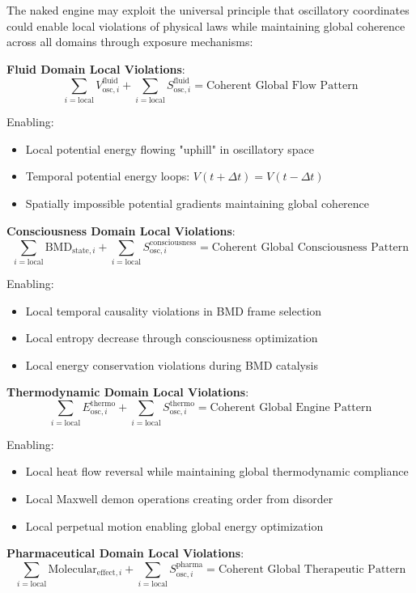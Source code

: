 \documentclass[11pt,a4paper]{article}
\theoremstyle{remark}
\begin{document}
The naked engine may exploit the universal principle that oscillatory coordinates could enable local violations of physical laws while maintaining global coherence across all domains through exposure mechanisms:

\textbf{Fluid Domain Local Violations}:
$$\sum_{i=\text{local}} V_{\text{osc},i}^{\text{fluid}} + \sum_{i=\text{local}} S_{\text{osc},i}^{\text{fluid}} = \text{Coherent Global Flow Pattern}$$

Enabling:
\begin{itemize}
\item Local potential energy flowing "uphill" in oscillatory space
\item Temporal potential energy loops: $V(t+\Delta t) = V(t-\Delta t)$
\item Spatially impossible potential gradients maintaining global coherence
\end{itemize}

\textbf{Consciousness Domain Local Violations}:
$$\sum_{i=\text{local}} \text{BMD}_{\text{state},i} + \sum_{i=\text{local}} S_{\text{osc},i}^{\text{consciousness}} = \text{Coherent Global Consciousness Pattern}$$

Enabling:
\begin{itemize}
\item Local temporal causality violations in BMD frame selection
\item Local entropy decrease through consciousness optimization
\item Local energy conservation violations during BMD catalysis
\end{itemize}

\textbf{Thermodynamic Domain Local Violations}:
$$\sum_{i=\text{local}} E_{\text{osc},i}^{\text{thermo}} + \sum_{i=\text{local}} S_{\text{osc},i}^{\text{thermo}} = \text{Coherent Global Engine Pattern}$$

Enabling:
\begin{itemize}
\item Local heat flow reversal while maintaining global thermodynamic compliance
\item Local Maxwell demon operations creating order from disorder
\item Local perpetual motion enabling global energy optimization
\end{itemize}

\textbf{Pharmaceutical Domain Local Violations}:
$$\sum_{i=\text{local}} \text{Molecular}_{\text{effect},i} + \sum_{i=\text{local}} S_{\text{osc},i}^{\text{pharma}} = \text{Coherent Global Therapeutic Pattern}$$
\end{document}
